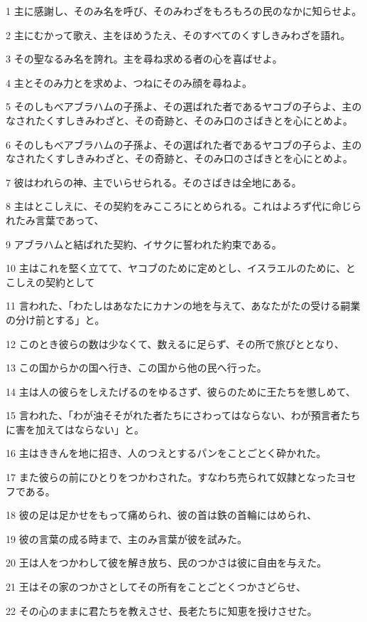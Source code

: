 \par 1 主に感謝し、そのみ名を呼び、そのみわざをもろもろの民のなかに知らせよ。
\par 2 主にむかって歌え、主をほめうたえ、そのすべてのくすしきみわざを語れ。
\par 3 その聖なるみ名を誇れ。主を尋ね求める者の心を喜ばせよ。
\par 4 主とそのみ力とを求めよ、つねにそのみ顔を尋ねよ。
\par 5 そのしもべアブラハムの子孫よ、その選ばれた者であるヤコブの子らよ、主のなされたくすしきみわざと、その奇跡と、そのみ口のさばきとを心にとめよ。
\par 6 そのしもべアブラハムの子孫よ、その選ばれた者であるヤコブの子らよ、主のなされたくすしきみわざと、その奇跡と、そのみ口のさばきとを心にとめよ。
\par 7 彼はわれらの神、主でいらせられる。そのさばきは全地にある。
\par 8 主はとこしえに、その契約をみこころにとめられる。これはよろず代に命じられたみ言葉であって、
\par 9 アブラハムと結ばれた契約、イサクに誓われた約束である。
\par 10 主はこれを堅く立てて、ヤコブのために定めとし、イスラエルのために、とこしえの契約として
\par 11 言われた、「わたしはあなたにカナンの地を与えて、あなたがたの受ける嗣業の分け前とする」と。
\par 12 このとき彼らの数は少なくて、数えるに足らず、その所で旅びととなり、
\par 13 この国からかの国へ行き、この国から他の民へ行った。
\par 14 主は人の彼らをしえたげるのをゆるさず、彼らのために王たちを懲しめて、
\par 15 言われた、「わが油そそがれた者たちにさわってはならない、わが預言者たちに害を加えてはならない」と。
\par 16 主はききんを地に招き、人のつえとするパンをことごとく砕かれた。
\par 17 また彼らの前にひとりをつかわされた。すなわち売られて奴隷となったヨセフである。
\par 18 彼の足は足かせをもって痛められ、彼の首は鉄の首輪にはめられ、
\par 19 彼の言葉の成る時まで、主のみ言葉が彼を試みた。
\par 20 王は人をつかわして彼を解き放ち、民のつかさは彼に自由を与えた。
\par 21 王はその家のつかさとしてその所有をことごとくつかさどらせ、
\par 22 その心のままに君たちを教えさせ、長老たちに知恵を授けさせた。
